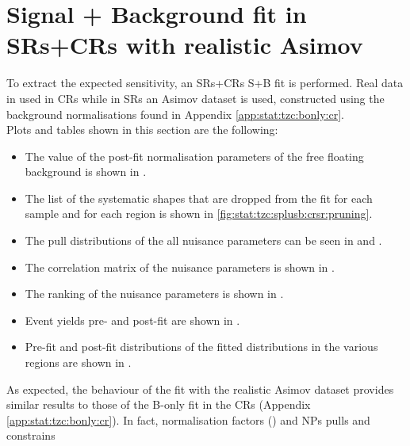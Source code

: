 
\section{Signal + Background fit in SRs+CRs with realistic Asimov}
\label{sec:stat:tzc:splusb:crsr}
To extract the expected sensitivity, an SRs+CRs S+B fit is performed. 
Real data in used in CRs while in SRs an Asimov dataset is used,
constructed using the background normalisations found in Appendix \ref{app:stat:tzc:bonly:cr}.\\
Plots and tables shown in this section are the following:
\begin{itemize}
\item The value of the post-fit normalisation parameters of the free floating background is shown in .
\item The list of the systematic shapes that are dropped from the fit for each sample and for each region is shown in \cref{fig:stat:tzc:splusb:crsr:pruning}.
\item The pull distributions of the all nuisance parameters can be seen in  and . 
\item The correlation matrix of the nuisance parameters is shown in . 
\item The ranking of the nuisance parameters is shown in . 
\item Event yields pre- and post-fit are shown in . 
\item Pre-fit and post-fit distributions of the fitted distributions in the various regions are shown in .
\end{itemize}
As expected, the behaviour of the fit with the realistic Asimov dataset
provides similar results to those of the B-only fit in the CRs
(Appendix \ref{app:stat:tzc:bonly:cr}). 
In fact, normalisation factors () and NPs
pulls and constrains 
